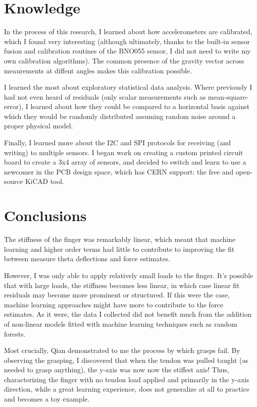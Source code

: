 \documentclass[12pt]{article}
\begin{document}

\section{Knowledge}

In the process of this research, I learned about how accelerometers are calibrated, which I found
very interesting (although ultimately, thanks to the built-in sensor fusion and calibration routines of the BNO055
sensor, I did not need to write my own calibration algorithms). The common presence of the gravity
vector across meaurements at diffent angles makes this calibration possible.

I learned the most about exploratory statistical data analysis. Where previously I had not even
heard of residuals (only scalar measurements such as mean-square-error), I learned about how they
could be compared to a horizontal basis against which they would be randomly distributed assuming
random noise around a proper physical model.

Finally, I learned more about the I2C and SPI protocols for receiving (and writing) to multiple
sensors. I began work on creating a custom printed circuit board to create a 3x4 array of sensors,
and decided to switch and learn to use a newcomer in the PCB design space, which has CERN support: the free and open-source
KiCAD tool.

\section{Conclusions}

The stiffness of the finger was remarkably linear, which meant that machine learning and higher
order terms had little to contribute to improving the fit between measure theta deflections and
force estimates.

However, I was only able to apply relatively small loads to the finger. It's possible that with
large loads, the stiffness becomes less linear, in which case linear fit residuals may become more
prominent or structured. If this were the case, machine learning approaches might have more to
contribute to the force estimates. As it were, the data I collected did not benefit much from the
addition of non-linear models fitted with machine learning techniques such as random forests.

Most crucially, Qian demonstrated to me the process by which grasps fail. By observing the grasping,
I discovered that when the tendon was pulled taught (as needed to grasp anything), the y-axis was now
now the stiffest axis! Thus, characterizing the finger with no tendon load applied and primarily in
the y-axis direction, while a great learning experience, does not generalize at all to practice and becomes a
toy example.
\end{document}
